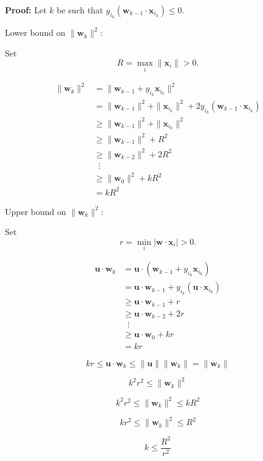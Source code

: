 \documentclass{beamer}
\newcommand{\vu}{\boldsymbol{u}}
\renewcommand{\vw}{\boldsymbol{w}}
\renewcommand{\vx}{\boldsymbol{x}}
\begin{document}
\begin{frame}{}
    \textbf{Proof:} Let $k$ be such that $y_{i_k}(\vw_{k-1}\cdot\vx_{i_k})\leq 0$.

    Lower bound on $\|\vw_k\|^2$:

    Set
    \[
        R = \max_i\|\vx_i\|>0.
    \]

    \vspace{-2em}\begin{align*}
        \|\vw_k\|^2 &= \|\vw_{k-1} + y_{i_k}\vx_{i_k}\|^2\\
        &= \|\vw_{k-1}\|^2 + \|\vx_{i_k}\|^2 + 2y_{i_k}(\vw_{k-1}\cdot\vx_{i_k})\\
        &\geq \|\vw_{k-1}\|^2 + \|\vx_{i_k}\|^2\\
        &\geq \|\vw_{k-1}\|^2 + R^2\\
        &\geq \|\vw_{k-2}\|^2 + 2R^2\\
        &\;\;\vdots\\
        &\geq \|\vw_0\|^2 + kR^2\\
        &= kR^2
    \end{align*}
\end{frame}

\begin{frame}{}
    Upper bound on $\|\vw_k\|^2$:
 
    Set
    \[
        r = \min_i |\vw\cdot \vx_i|>0.
    \]

    \vspace{-2em}\begin{align*}
        \vu\cdot \vw_k &= \vu\cdot(\vw_{k-1} + y_{i_k}\vx_{i_k})\\
        &= \vu\cdot \vw_{k-1} + y_{i_k}(\vu\cdot \vx_{i_k})\\
        &\geq \vu\cdot \vw_{k-1} + r\\
        &\geq \vu\cdot \vw_{k-2} + 2r\\
        &\;\;\vdots\\
        &\geq \vu\cdot\vw_0 + kr\\
        &= kr
    \end{align*}

    \vspace{-2em}\[
        kr\leq \vu\cdot\vw_k\leq \|\vu\|\|\vw_k\| = \|\vw_k\|
    \]

    \vspace{-2em}\[
        k^2r^2\leq \|\vw_k\|^2
    \]
\end{frame}

\begin{frame}{}
    \[
        k^2r^2\leq \|\vw_k\|^2\leq kR^2
    \]

    \[
        kr^2\leq \|\vw_k\|^2\leq R^2
    \]

    \[
        k\leq \frac{R^2}{r^2}
    \]
    
\end{frame}
\end{document}
